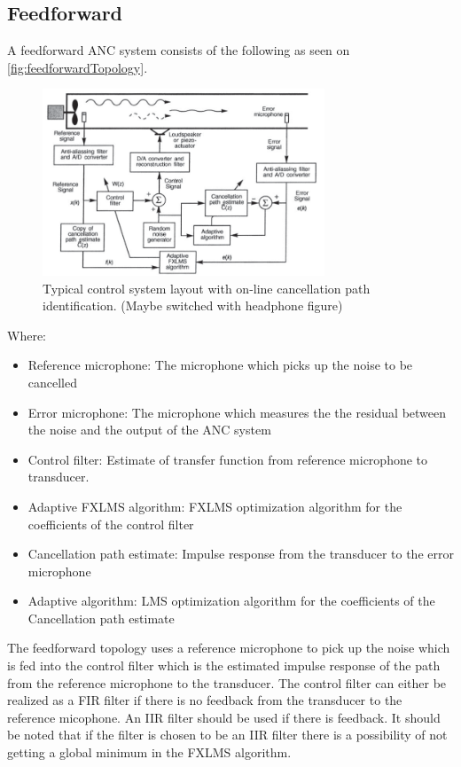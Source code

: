 \subsection*{Feedforward}
A feedforward ANC system consists of the following as seen on \autoref{fig:feedforwardTopology}.
\begin{figure}[H]
	\centering
	\includegraphics[width=0.75\textwidth]{figures/BasicSystem/feedforward}
	\caption{Typical control system layout with on-line cancellation path identification. (Maybe switched with headphone figure)}
	\label{fig:feedforwardTopology}
\end{figure}
Where:
\begin{itemize}
\item Reference microphone: The microphone which picks up the noise to be cancelled 
\item Error microphone: The microphone which measures the the residual between the noise and the output of the ANC system
\item Control filter: Estimate of transfer function from reference microphone to transducer. 
\item Adaptive FXLMS algorithm: FXLMS optimization algorithm for the coefficients of the control filter
\item Cancellation path estimate: Impulse response from the transducer to the error microphone
\item Adaptive algorithm: LMS optimization algorithm for the coefficients of the Cancellation path estimate 
\end{itemize}

The feedforward topology uses a reference microphone to pick up the noise which is fed into the control filter which is the estimated impulse response of the path from the reference microphone to the transducer. The control filter can either be realized as a FIR filter if there is no feedback from the transducer to the reference micophone. An IIR filter should be used if there is feedback. It should be noted that if the filter is chosen to be an IIR filter there is a possibility of not getting a global minimum in the FXLMS algorithm.

